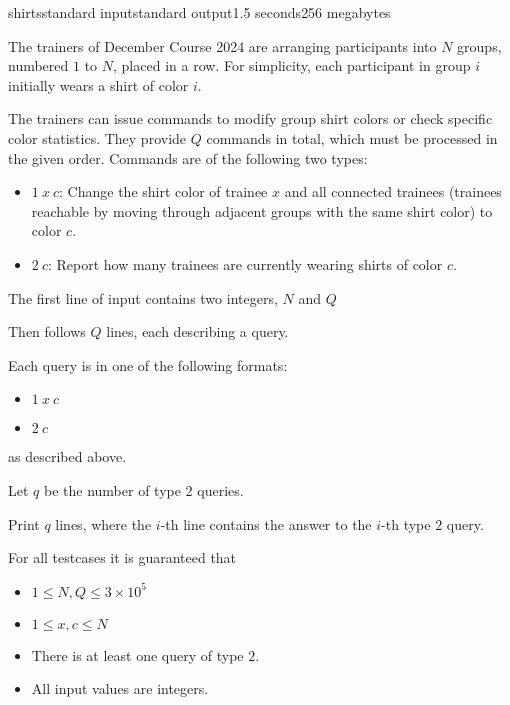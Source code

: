 \begin{problem}{shirts}{standard input}{standard output}{1.5 seconds}{256 megabytes}

The trainers of December Course 2024 are arranging participants into $N$ groups, numbered $1$ to $N$, placed in a row. For simplicity, each participant in group $i$ initially wears a shirt of color $i$.

The trainers can issue commands to modify group shirt colors or check specific color statistics. They provide $Q$ commands in total, which must be processed in the given order. Commands are of the following two types:

\begin{itemize}
\item $1\ x\ c$: Change the shirt color of trainee $x$ and all connected trainees (trainees reachable by moving through adjacent groups with the same shirt color) to color $c$.

\item $2\ c$: Report how many trainees are currently wearing shirts of color $c$.
\end{itemize}

\InputFile
The first line of input contains two integers, $N$ and $Q$

Then follows $Q$ lines, each describing a query.

Each query is in one of the following formats:

\begin{itemize}
\item $1\ x\ c$

\item $2\ c$
\end{itemize}

as described above.

\OutputFile
Let $q$ be the number of type $2$ queries. 

Print $q$ lines, where the $i$-th line contains the answer to the $i$-th type $2$ query.

\Scoring
For all testcases it is guaranteed that

\begin{itemize}
\item $1 \leq N, Q \leq 3 \times 10^5$

\item $1 \leq x, c \leq N$

\item There is at least one query of type $2$.

\item All input values are integers.
\end{itemize}


\end{problem}
